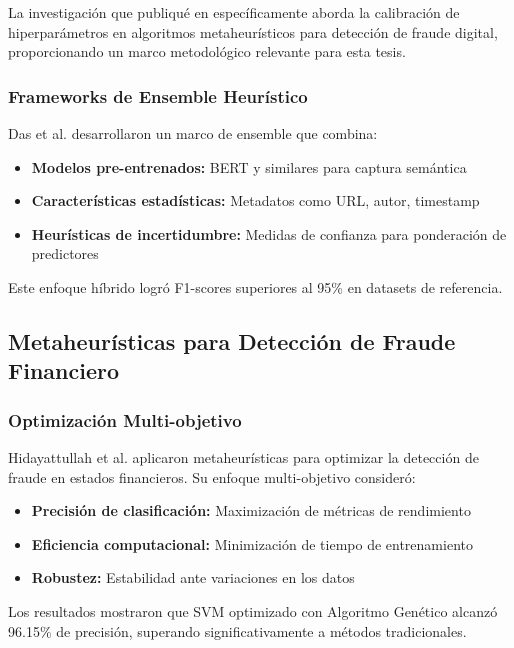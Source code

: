 La investigación que publiqué en \cite{hurtado2024calibracion} específicamente aborda la calibración de hiperparámetros en algoritmos metaheurísticos para detección de fraude digital, proporcionando un marco metodológico relevante para esta tesis.

\subsubsection{Frameworks de Ensemble Heurístico}

Das et al. \cite{das2022heuristic} desarrollaron un marco de ensemble que combina:
\begin{itemize}
    \item \textbf{Modelos pre-entrenados:} BERT y similares para captura semántica
    \item \textbf{Características estadísticas:} Metadatos como URL, autor, timestamp
    \item \textbf{Heurísticas de incertidumbre:} Medidas de confianza para ponderación de predictores
\end{itemize}

Este enfoque híbrido logró F1-scores superiores al 95\% en datasets de referencia.

\subsection{Metaheurísticas para Detección de Fraude Financiero}

\subsubsection{Optimización Multi-objetivo}

Hidayattullah et al. \cite{hidayattullah2020financial} aplicaron metaheurísticas para optimizar la detección de fraude en estados financieros. Su enfoque multi-objetivo consideró:
\begin{itemize}
    \item \textbf{Precisión de clasificación:} Maximización de métricas de rendimiento
    \item \textbf{Eficiencia computacional:} Minimización de tiempo de entrenamiento
    \item \textbf{Robustez:} Estabilidad ante variaciones en los datos
\end{itemize}

Los resultados mostraron que SVM optimizado con Algoritmo Genético alcanzó 96.15\% de precisión, superando significativamente a métodos tradicionales.

